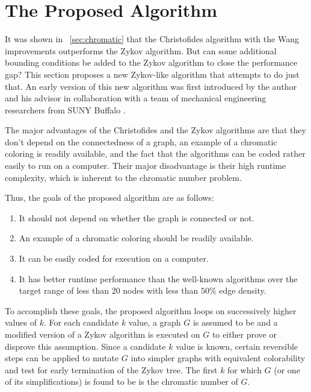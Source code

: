 \section{The Proposed Algorithm}\label{sec:algorithm}

It was shown in \sectionname~\ref{sec:chromatic} that the Christofides algorithm with the Wang improvements
outperforms the Zykov algorithm.  But can some additional bounding conditions be added to the Zykov algorithm to
close the performance gap?  This section proposes a new Zykov-like algorithm that attempts to do just that.  An
early version of this new algorithm was first introduced by the author and his advisor in collaboration with a team
of mechanical engineering researchers from SUNY Buffalo \cite{cavallaro}.

The major advantages of the Christofides and the Zykov algorithms are that they don't depend on the connectedness
of a graph, an example of a chromatic coloring is readily available, and the fact that the algorithms can be coded
rather easily to run on a computer.  Their major disadvantage is their high runtime complexity, which is inherent
to the chromatic number problem.

Thus, the goals of the proposed algorithm are as follows:
\begin{enumerate}
\item It should not depend on whether the graph is connected or not.
\item An example of a chromatic coloring should be readily available.
\item It can be easily coded for execution on a computer.
\item It has better runtime performance than the well-known algorithms over the target range of less than
  \(20\) nodes with less than \(50\%\) edge density.
\end{enumerate}

To accomplish these goals, the proposed algorithm loops on successively higher values of \(k\).  For each candidate
\(k\) value, a graph \(G\) is assumed to be  and a modified version of a Zykov algorithm is executed
on \(G\) to either prove or disprove this assumption.  Since a candidate \(k\) value is known, certain reversible
steps can be applied to mutate \(G\) into simpler graphs with equivalent colorability and test for early
termination of the Zykov tree.  The first \(k\) for which \(G\) (or one of its simplifications) is found to be
 is the chromatic number of \(G\).

